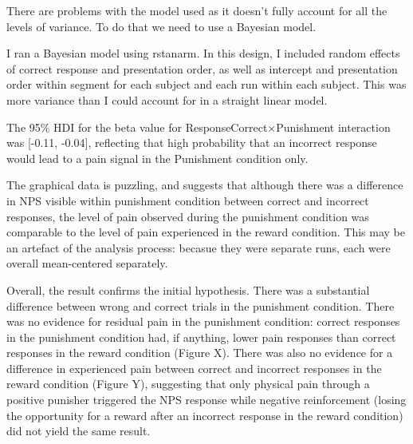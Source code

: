\documentclass[]{article}
\begin{document}
There are problems with the model used as it doesn't fully account for
all the levels of variance. To do that we need to use a Bayesian model.

I ran a Bayesian model using rstanarm. In this design, I included random
effects of correct response and presentation order, as well as intercept
and presentation order within segment for each subject and each run
within each subject. This was more variance than I could account for in
a straight linear model.

The 95\% HDI for the beta value for ResponseCorrect\(\times\)Punishment
interaction was {[}-0.11, -0.04{]}, reflecting that high probability
that an incorrect response would lead to a pain signal in the Punishment
condition only.

The graphical data is puzzling, and suggests that although there was a
difference in NPS visible within punishment condition between correct
and incorrect responses, the level of pain observed during the
punishment condition was comparable to the level of pain experienced in
the reward condition. This may be an artefact of the analysis process:
becasue they were separate runs, each were overall mean-centered
separately.

Overall, the result confirms the initial hypothesis. There was a
substantial difference between wrong and correct trials in the
punishment condition. There was no evidence for residual pain in the
punishment condition: correct responses in the punishment condition had,
if anything, lower pain responses than correct responses in the reward
condition (Figure X). There was also no evidence for a difference in
experienced pain between correct and incorrect responses in the reward
condition (Figure Y), suggesting that only physical pain through a
positive punisher triggered the NPS response while negative
reinforcement (losing the opportunity for a reward after an incorrect
response in the reward condition) did not yield the same result.
\end{document}
